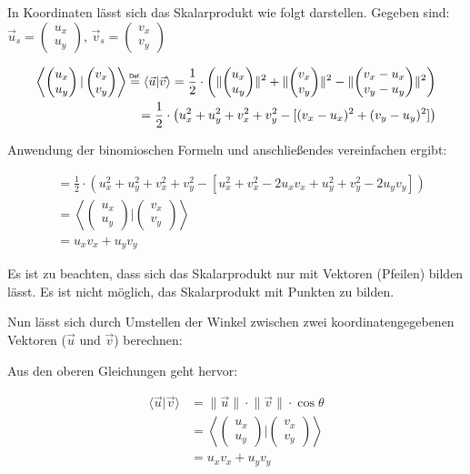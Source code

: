 \documentclass{article}
\newcommand{\m}[1]{\begin{pmatrix}#1\end{pmatrix}}
\newcommand{\myeq}[1]{\mathrel{\overset{\makebox[0pt]{\mbox{\normalfont\tiny\sffamily #1}}}{=}}}
\begin{document}
    In Koordinaten lässt sich das Skalarprodukt wie folgt darstellen.
    Gegeben sind:
    ${\vec{u}}_{s} = \m{u_x \\ u_y}$, ${\vec{v}}_{s} = \m{v_x \\ v_y}$

    \[
        \begin{split}
            \left \langle \m{u_x \\ u_y} \vert \m{v_x \\ v_y} \right \rangle \myeq{Def.} \left \langle \vec{u} \vert \vec{v} \right \rangle = \frac{1}{2} \cdot \left ( \lVert \m{u_x \\ u_y} \rVert ^2 + \lVert \m{v_x \\ v_y} \rVert ^2 - \lVert \m{v_x - u_x \\ v_y - u_y} \rVert ^2 \right ) \\
            = \frac{1}{2} \cdot \left ( u_x^2 + u_y^2 + v_x^2 + v_y^2 - [(v_x - u_x)^2 + (v_y - u_y)^2] \right ) \\
        \end{split}
    \]

    Anwendung der binomioschen Formeln und anschließendes vereinfachen ergibt:

    \[
      \begin{split}
        &= \frac{1}{2} \cdot \left ( u_x^2 + u_y^2 + v_x^2 + v_y^2 - [u_x^2 + v_x^2 - 2u_x v_x + u_y^2 + v_y^2 - 2u_y v_y] \right ) \\
        &= \left \langle \m{u_x \\ u_y} \vert \m{v_x \\ v_y} \right \rangle \\
        &= u_x v_x + u_y v_y
      \end{split}  
    \]

    Es ist zu beachten, dass sich das Skalarprodukt nur mit Vektoren (Pfeilen) bilden lässt.
    Es ist nicht möglich, das Skalarprodukt mit Punkten zu bilden.


    Nun lässt sich durch Umstellen der Winkel zwischen zwei koordinatengegebenen
    Vektoren ($\vec{u}$ und $\vec{v}$) berechnen:

    Aus den oberen Gleichungen geht hervor:

    \[
      \begin{split}
        \langle \vec{u} \vert \vec{v} \rangle &= \lVert \vec{u} \rVert \cdot \lVert \vec{v} \rVert \cdot \cos \theta \\
        &= \left \langle \m{u_x \\ u_y} \vert \m{v_x \\ v_y} \right \rangle \\
        &= u_x v_x + u_y v_y \\
      \end{split}  
    \]
\end{document}
